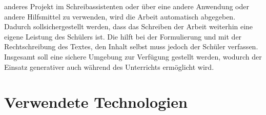 \documentclass[../main.tex]{subfiles}
\begin{document}
anderes Projekt im Schreibassistenten oder über eine andere Anwendung  oder andere Hilfsmittel zu verwenden, wird die Arbeit automatisch abgegeben. Dadurch sollsichergestellt 
werden, dass das Schreiben der Arbeit weiterhin eine eigene Leistung des Schülers ist. Die  hilft bei der Formulierung und mit der Rechtschreibung des Textes, den Inhalt selbst 
muss jedoch der Schüler verfassen. Insgesamt soll eine sichere Umgebung zur Verfügung gestellt werden, wodurch der Einsatz generativer  auch während des Unterrichts ermöglicht wird.


\section{Verwendete Technologien}
\end{document}
